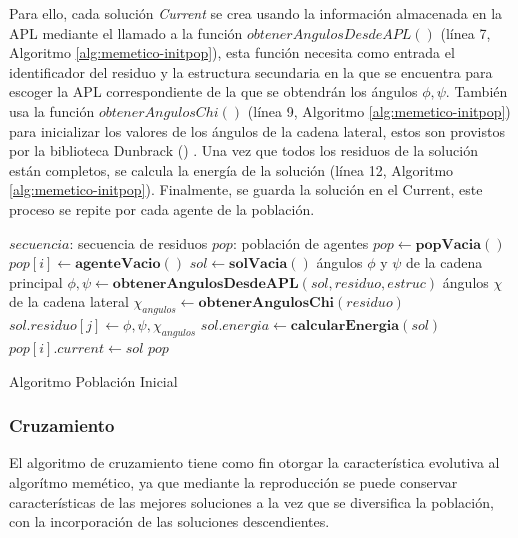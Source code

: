 Para ello, cada solución \textit{Current} se crea usando la información almacenada en la APL mediante el llamado a la función $obtenerAngulosDesdeAPL()$ (línea 7, Algoritmo \ref{alg:memetico-initpop}), esta función necesita como entrada el identificador del residuo y la estructura secundaria en la que se encuentra para escoger la APL correspondiente de la que se obtendrán los ángulos $\phi,\psi$. También usa la función $obtenerAngulosChi()$ (línea 9, Algoritmo \ref{alg:memetico-initpop}) para inicializar los valores de los ángulos de la cadena lateral, estos son provistos por la biblioteca Dunbrack (\citealp{dunbrack}) . Una vez que todos los residuos de la solución están completos, se calcula la energía de la solución (línea 12, Algoritmo \ref{alg:memetico-initpop}). Finalmente, se guarda la solución en el Current, este proceso se repite por cada agente de la población.
\\[25pt]
\begin{algorithm}[H]
	\begin{algorithmic}[1]
		\REQUIRE $secuencia$: secuencia de residuos
		\ENSURE $pop$: población de agentes
		\STATE $pop \leftarrow \textbf{popVacia}()$
		    \STATE $pop[i] \leftarrow \textbf{agenteVacio}()$
			\STATE $sol \leftarrow \textbf{solVacia}()$
				\STATE \COMMENT ángulos $\phi$ y $\psi$ de la cadena principal
				\STATE $\phi,\psi \leftarrow \textbf{obtenerAngulosDesdeAPL}(sol, residuo, estruc)$
				\STATE \COMMENT ángulos $\chi$  de la cadena lateral
				\STATE $\chi_{angulos} \gets \textbf{obtenerAngulosChi}(residuo)$
				\STATE $sol.residuo[j] \leftarrow \phi,\psi,\chi_{angulos}$
			\ENDFOR
			\STATE $sol.energia \gets \textbf{calcularEnergia}(sol) $
			\STATE $pop[i].current \leftarrow sol$
		\ENDFOR
		\RETURN $pop$
	\end{algorithmic}
	\caption{Algoritmo Población Inicial}
	\label{alg:memetico-initpop}
\end{algorithm}

\subsubsection{Cruzamiento}
El algoritmo de cruzamiento tiene como fin otorgar la característica evolutiva al algorítmo memético, ya que mediante la reproducción se puede conservar características de las mejores soluciones a la vez que se diversifica la población, con la incorporación de las soluciones descendientes.

